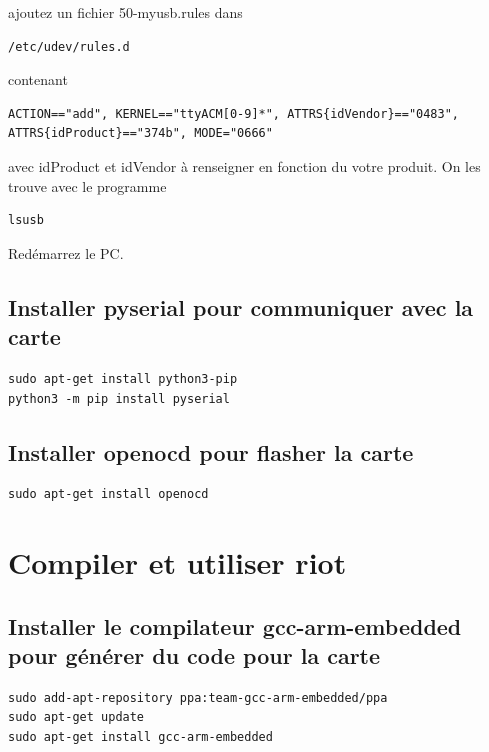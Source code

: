 \documentclass{article}
\begin{document}
ajoutez un fichier 50-myusb.rules dans 

\begin{verbatim}
/etc/udev/rules.d

\end{verbatim}
contenant 

\begin{verbatim}
ACTION=="add", KERNEL=="ttyACM[0-9]*", ATTRS{idVendor}=="0483",
ATTRS{idProduct}=="374b", MODE="0666"

\end{verbatim}

avec idProduct et idVendor à renseigner en fonction du votre produit. On les trouve avec le programme

\begin{verbatim}
lsusb

\end{verbatim}
Redémarrez le PC.

\subsection{Installer pyserial pour communiquer avec la carte}

\begin{verbatim}
sudo apt-get install python3-pip
python3 -m pip install pyserial
\end{verbatim}

\subsection{Installer openocd pour flasher la carte}

\begin{verbatim}
sudo apt-get install openocd

\end{verbatim}


\section{Compiler et utiliser riot}

\subsection{Installer le compilateur gcc-arm-embedded pour générer du code pour la carte}

\begin{verbatim}
sudo add-apt-repository ppa:team-gcc-arm-embedded/ppa
sudo apt-get update
sudo apt-get install gcc-arm-embedded

\end{verbatim}
\end{document}
